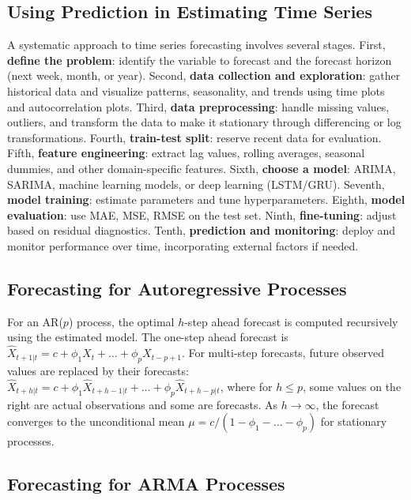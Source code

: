 \documentclass[11pt,a4paper]{article}
\begin{document}
\subsection{Using Prediction in Estimating Time Series}

A systematic approach to time series forecasting involves several stages. First, \textbf{define the problem}: identify the variable to forecast and the forecast horizon (next week, month, or year). Second, \textbf{data collection and exploration}: gather historical data and visualize patterns, seasonality, and trends using time plots and autocorrelation plots. Third, \textbf{data preprocessing}: handle missing values, outliers, and transform the data to make it stationary through differencing or log transformations. Fourth, \textbf{train-test split}: reserve recent data for evaluation. Fifth, \textbf{feature engineering}: extract lag values, rolling averages, seasonal dummies, and other domain-specific features. Sixth, \textbf{choose a model}: ARIMA, SARIMA, machine learning models, or deep learning (LSTM/GRU). Seventh, \textbf{model training}: estimate parameters and tune hyperparameters. Eighth, \textbf{model evaluation}: use MAE, MSE, RMSE on the test set. Ninth, \textbf{fine-tuning}: adjust based on residual diagnostics. Tenth, \textbf{prediction and monitoring}: deploy and monitor performance over time, incorporating external factors if needed.

\subsection{Forecasting for Autoregressive Processes}

For an AR($p$) process, the optimal $h$-step ahead forecast is computed recursively using the estimated model. The one-step ahead forecast is $\hat{X}_{t+1|t} = c + \phi_1 X_t + \ldots + \phi_p X_{t-p+1}$. For multi-step forecasts, future observed values are replaced by their forecasts: $\hat{X}_{t+h|t} = c + \phi_1 \hat{X}_{t+h-1|t} + \ldots + \phi_p \hat{X}_{t+h-p|t}$, where for $h \leq p$, some values on the right are actual observations and some are forecasts. As $h \to \infty$, the forecast converges to the unconditional mean $\mu = c/(1 - \phi_1 - \ldots - \phi_p)$ for stationary processes.

\subsection{Forecasting for ARMA Processes}
\end{document}
